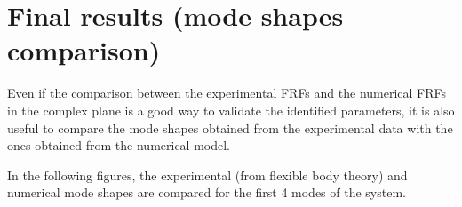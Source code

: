 \section{Final results (mode shapes comparison)}
\label{sec:final_results_A}

Even if the comparison between the experimental FRFs and the numerical FRFs in the complex plane is a good way to validate the identified parameters, it is also useful to compare the mode shapes obtained from the experimental data with the ones obtained from the numerical model.

In the following figures, the experimental (from flexible body theory) and numerical mode shapes are compared for the first 4 modes of the system.


